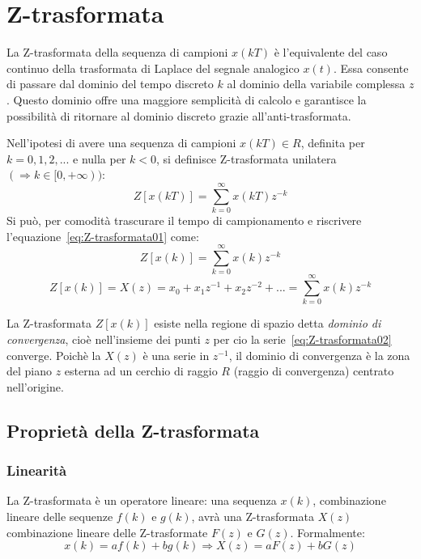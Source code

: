 \documentclass[a4paper]{report}
\begin{document}
\chapter{Z-trasformata}
La Z-trasformata della sequenza di campioni $x(kT)$ \`e l'equivalente
del caso continuo della trasformata di Laplace del segnale analogico
$x(t)$. Essa consente di passare dal dominio del tempo discreto $k$ al
dominio della variabile complessa $z$. Questo dominio offre una
maggiore semplicit\`a di calcolo e garantisce la possibilit\`a di
ritornare al dominio discreto grazie all'anti-trasformata.

Nell'ipotesi di avere una sequenza di campioni $x(kT) \in R$, definita
per $k = 0, 1, 2, ...$ e nulla per $k < 0$, si definisce
Z-trasformata unilatera $( \Rightarrow k \in [0, + \infty))$:
\begin{equation}\label{eq:Z-trasformata01}
  Z[x(kT)] = \sum\limits_{k=0}^{\infty} x(kT) z^{-k}
\end{equation}
Si pu\`o, per comodit\`a trascurare il tempo di campionamento e
riscrivere l'equazione~\ref{eq:Z-trasformata01} come:
\begin{equation}\label{eq:Z-trasformata02}
  Z[x(k)] = \sum\limits_{k=0}^{\infty} x(k) z^{-k}
\end{equation}
\[
Z[x(k)] = X(z) = x_0 + x_1z^{-1} + x_2 z^{-2} + ... =
\sum\limits_{k=0}^{\infty} x(k) z^{-k} 
\]

La Z-trasformata $Z[x(k)]$ esiste nella regione di spazio detta {\em
  dominio di convergenza}, cio\`e
nell'insieme dei punti $z$ per cio la serie~\ref{eq:Z-trasformata02}
converge. Poich\`e la $X(z)$ \`e una serie in $z^{-1}$, il dominio di
convergenza \`e la zona del piano $z$ esterna ad un cerchio di raggio
$R$ (raggio di convergenza) centrato
nell'origine. 

\section{Propriet\`a della Z-trasformata}
\subsection{Linearit\`a}
La Z-trasformata \`e un operatore lineare: una sequenza $x(k)$,
combinazione lineare delle sequenze $f(k)$ e $g(k)$, avr\`a una
Z-trasformata $X(z)$ combinazione lineare delle Z-trasformate $F(z)$ e
$G(z)$. Formalmente:
  \[
   x(k) = af(k) + bg(k) \Rightarrow X(z) = aF(z) + bG(z)
  \]
  
\end{document}
